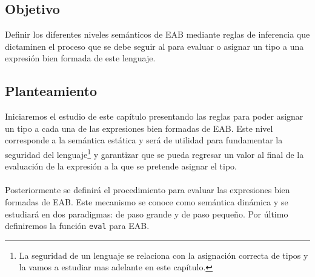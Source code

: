     \subsection*{Objetivo}
        Definir los diferentes niveles semánticos de \textsf{EAB} mediante reglas de inferencia que dictaminen el proceso que se 
        debe seguir al para evaluar o asignar un tipo a una expresión bien formada de este lenguaje.

    \subsection*{Planteamiento}
        Iniciaremos el estudio de este capítulo presentando las reglas para poder asignar un tipo a cada una de las expresiones bien formadas de \textsf{EAB}. Este nivel corresponde a la semántica estática y será de utilidad para fundamentar la seguridad del lenguaje\footnote{La seguridad de un lenguaje se relaciona con la asignación correcta de tipos y la vamos a estudiar mas adelante en este capítulo.} y garantizar que se pueda regresar un valor al final de la evaluación de la expresión a la que se pretende asignar el tipo.\\\\
        Posteriormente se definirá el procedimiento para evaluar las expresiones bien formadas de \textsf{EAB}. Este mecanismo se conoce como semántica dinámica y se estudiará en dos paradigmas: de paso grande y de paso pequeño. Por último definiremos la función \texttt{eval} para \textsf{EAB}.

